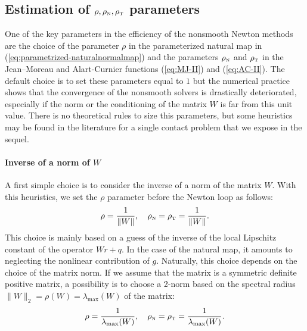 \subsection{Estimation of $\rho, \rho_{\hbox{\tiny{N}}}, \rho_{\hbox{\tiny{T}}}$ parameters}

One of the key parameters in the efficiency of the nonsmooth Newton methods are the choice of the parameter $\rho$ in the parameterized natural map in (\ref{eq:parametrized-naturalnormalmap}) and the parameters  $\rho_{\hbox{\tiny{N}}}$ and $\rho_{\hbox{\tiny{T}}}$ in the Jean--Moreau and Alart-Curnier functions (\ref{eq:MJ-II}) and (\ref{eq:AC-II}). The default choice is to set these parameters equal to $1$ but the numerical practice shows  that the convergence of the nonsmooth solvers is drastically deteriorated, especially  if the norm or the conditioning of the matrix $W$ is far from this unit value. There is no theoretical rules to size this parameters, but some heuristics may be found in the literature for a single contact problem that we expose in the sequel.

\paragraph{Inverse of a norm of $W$} A first simple choice is to consider the inverse of a norm of the matrix $W$. With this heuristics, we set the $\rho$ parameter before the Newton loop as follows:
\begin{equation}
  \label{eq:rho-1}
  \rho = \frac 1 {\|W\|}, \quad  \rho_\n =  \rho_\t = \frac 1 {\|W\|}.
\end{equation}
This choice is mainly based on a guess of the inverse of the local Lipschitz constant of the operator $Wr+q$. In the case of the natural map, it amounts to neglecting the nonlinear contribution of $g$. Naturally, this choice depends on the choice of the matrix norm. If we assume that the matrix is a symmetric definite positive matrix, a possibility is to choose a 2-norm based on the spectral radius $\|W\|_2 = \rho(W) =\lambda_{\max}(W)$ of the matrix:
\begin{equation}
  \label{eq:rho-2}
  \rho = \frac 1 {\lambda_{\max}(W)}, \quad  \rho_\n = \rho_\t = \frac 1 {\lambda_{\max}(W)}.
\end{equation}

